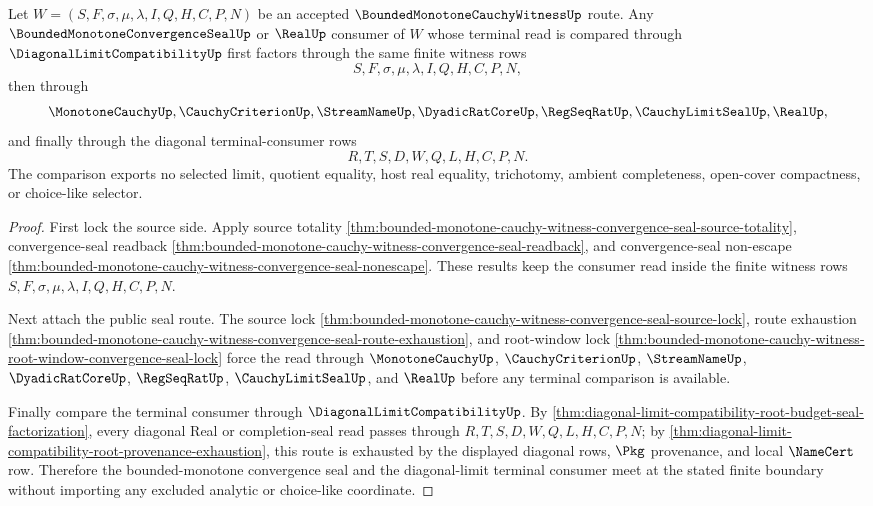 \begin{theorem}
\label{thm:bounded-monotone-cauchy-witness-convergence-seal-diagonal-readback}
Let $W=(S,F,\sigma,\mu,\lambda,I,Q,H,C,P,N)$ be an accepted $\BoundedMonotoneCauchyWitnessUp$ route. Any $\BoundedMonotoneConvergenceSealUp$ or $\RealUp$ consumer of $W$ whose terminal read is compared through $\DiagonalLimitCompatibilityUp$ first factors through the same finite witness rows
$$
S,F,\sigma,\mu,\lambda,I,Q,H,C,P,N,
$$
then through
$$
\MonotoneCauchyUp,\CauchyCriterionUp,\StreamNameUp,\DyadicRatCoreUp,\RegSeqRatUp,\CauchyLimitSealUp,\RealUp,
$$
and finally through the diagonal terminal-consumer rows
$$
R,T,S,D,W,Q,L,H,C,P,N.
$$
The comparison exports no selected limit, quotient equality, host real equality, trichotomy, ambient completeness, open-cover compactness, or choice-like selector.
\end{theorem}
\begin{proof}
First lock the source side. Apply source totality \autoref{thm:bounded-monotone-cauchy-witness-convergence-seal-source-totality}, convergence-seal readback \autoref{thm:bounded-monotone-cauchy-witness-convergence-seal-readback}, and convergence-seal non-escape \autoref{thm:bounded-monotone-cauchy-witness-convergence-seal-nonescape}. These results keep the consumer read inside the finite witness rows $S,F,\sigma,\mu,\lambda,I,Q,H,C,P,N$.

Next attach the public seal route. The source lock \autoref{thm:bounded-monotone-cauchy-witness-convergence-seal-source-lock}, route exhaustion \autoref{thm:bounded-monotone-cauchy-witness-convergence-seal-route-exhaustion}, and root-window lock \autoref{thm:bounded-monotone-cauchy-witness-root-window-convergence-seal-lock} force the read through $\MonotoneCauchyUp$, $\CauchyCriterionUp$, $\StreamNameUp$, $\DyadicRatCoreUp$, $\RegSeqRatUp$, $\CauchyLimitSealUp$, and $\RealUp$ before any terminal comparison is available.

Finally compare the terminal consumer through $\DiagonalLimitCompatibilityUp$. By \autoref{thm:diagonal-limit-compatibility-root-budget-seal-factorization}, every diagonal Real or completion-seal read passes through $R,T,S,D,W,Q,L,H,C,P,N$; by \autoref{thm:diagonal-limit-compatibility-root-provenance-exhaustion}, this route is exhausted by the displayed diagonal rows, $\Pkg$ provenance, and local $\NameCert$ row. Therefore the bounded-monotone convergence seal and the diagonal-limit terminal consumer meet at the stated finite boundary without importing any excluded analytic or choice-like coordinate.
\end{proof}

